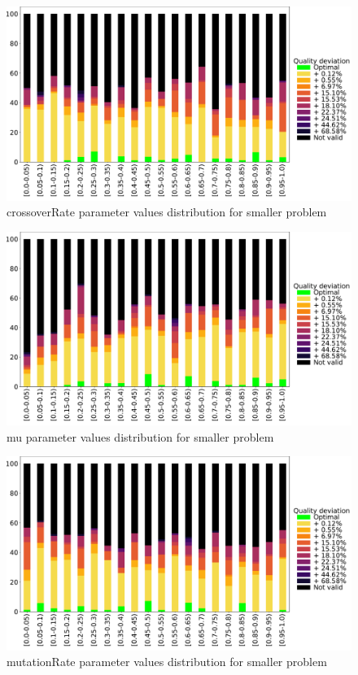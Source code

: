 \begin{figure}
	\centering
	\includegraphics[width=\textwidth]{images/DistrObj/crossoverRate.pdf}
	\caption[crossoverRate parameter values distribution for smaller problem]{crossoverRate parameter values distribution for smaller problem}  
	\label{fig:crossoverRate_Obj}
\end{figure}
\begin{figure}
	\centering
	\includegraphics[width=\textwidth]{images/DistrObj/mu.pdf}
	\caption[mu parameter values distribution for smaller problem]{mu parameter values distribution for smaller problem}
	\label{fig:mu_Obj}
\end{figure}
\begin{figure}
	\centering
	\includegraphics[width=\textwidth]{images/DistrObj/mutationRate.pdf}
	\caption[mutationRate parameter values distribution for smaller problem]{mutationRate parameter values distribution for smaller problem}
	\label{fig:mutationRate_Obj}
\end{figure}

